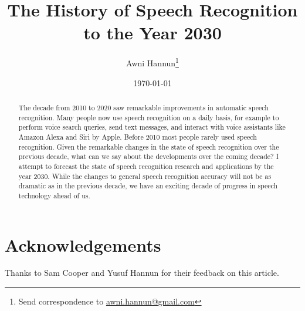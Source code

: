 \documentclass[twocolumn, 12pt]{article}
\title{The History of Speech Recognition to the Year 2030}
\author{Awni Hannun\footnote{
  Send correspondence to
  \href{mailto:awni.hannun@gmail.com}{awni.hannun@gmail.com}}}
\date{\today}
\begin{document}
\maketitle

\begin{abstract}
    The decade from 2010 to 2020 saw remarkable improvements in automatic
    speech recognition. Many people now use speech recognition on a daily
    basis, for example to perform voice search queries, send text messages, and
    interact with voice assistants like Amazon Alexa and Siri by Apple. Before
    2010 most people rarely used speech recognition. Given the remarkable
    changes in the state of speech recognition over the previous decade, what
    can we say about the developments over the coming decade? I attempt to
    forecast the state of speech recognition research and applications by the
    year 2030. While the changes to general speech recognition accuracy will
    not be as dramatic as in the previous decade, we have an exciting decade of
    progress in speech technology ahead of us.
\end{abstract}







\section*{\large Acknowledgements}

Thanks to Sam Cooper and Yusuf Hannun for their feedback on this article.



\end{document}
